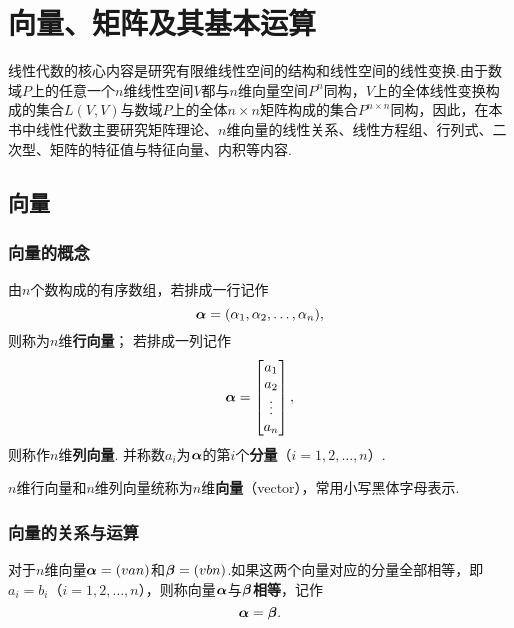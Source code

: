 \chapter{向量、矩阵及其基本运算}
线性代数的核心内容是研究有限维线性空间的结构和线性空间的线性变换.由于数域\(P\)上的任意一个\(n\)维线性空间\(V\)都与\(n\)维向量空间\(P^n\)同构，\(V\)上的全体线性变换构成的集合\(L(V,V)\)与数域\(P\)上的全体\(n \times n\)矩阵构成的集合\(P^{n \times n}\)同构，因此，在本书中线性代数主要研究矩阵理论、\(n\)维向量的线性关系、线性方程组、行列式、二次型、矩阵的特征值与特征向量、内积等内容.

\section{向量}
\subsection{向量的概念}
\begin{definition}
由\(n\)个数构成的有序数组，若排成一行记作\[
\boldsymbol{\alpha} = (\alpha_1, \alpha_2, \dotsc, \alpha_n),
\]则称为\(n\)维\textbf{行向量}；
若排成一列记作\[
\boldsymbol{\alpha} = \begin{bmatrix}
a_1 \\ a_2 \\ \vdots \\ a_n
\end{bmatrix},
\]则称作\(n\)维\textbf{列向量}.
并称数\(a_i\)为\(\boldsymbol{\alpha}\)的第\(i\)个\textbf{分量}（\(i=1,2,\dotsc,n\)）.

\(n\)维行向量和\(n\)维列向量统称为\(n\)维\textbf{向量}（vector），常用小写黑体字母表示.
\end{definition}

\subsection{向量的关系与运算}
\begin{definition}
对于\(n\)维向量\(\boldsymbol{\alpha} = (v{a}{n})\)和\(\boldsymbol{\beta} = (v{b}{n})\).如果这两个向量对应的分量全部相等，即\(a_i = b_i\)（\(i=1,2,\dotsc,n\)），则称向量\(\boldsymbol{\alpha}\)与\(\boldsymbol{\beta}\)\textbf{相等}，记作\[
\boldsymbol{\alpha} = \boldsymbol{\beta}.
\]
\end{definition}

